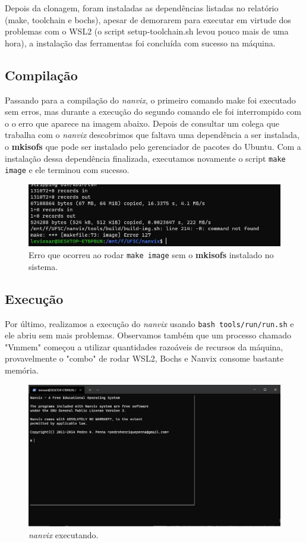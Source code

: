 \documentclass[12pt]{article}
\begin{document}
Depois da clonagem, foram instaladas as dependências listadas no relatório (make, toolchain e bochs), apesar de demorarem para executar em virtude dos problemas com o WSL2 (o script setup-toolchain.sh levou pouco mais de uma hora), a instalação das ferramentas foi concluída com sucesso na máquina. 

\subsection{Compilação}

Passando para a compilação do \emph{nanvix}, o primeiro comando make foi executado sem erros, mas durante a execução do segundo comando ele foi interrompido com o o erro que aparece na imagem abaixo. Depois de consultar um colega que trabalha com o \emph{nanvix} descobrimos que faltava uma dependência a ser instalada, o \textbf{mkisofs} que pode ser instalado pelo gerenciador de pacotes do Ubuntu. Com a instalação dessa dependência finalizada, executamos novamente o script \texttt{make image} e ele terminou com sucesso.

\begin{figure}[H]
    \includegraphics[width=\linewidth]{error.jpg}
    \caption{Erro que ocorreu ao rodar \texttt{make image} sem o \textbf{mkisofs} instalado no sistema.}
\end{figure}

\subsection{Execução}

Por último, realizamos a execução do \emph{nanvix} usando \texttt{bash tools/run/run.sh} e ele abriu sem mais problemas. Observamos também que um processo chamado "Vmmem" começou a utilizar quantidades razoáveis de recursos da máquina, provavelmente o "combo" de rodar WSL2, Bochs e Nanvix consome bastante memória. 

\begin{figure}[H]
    \includegraphics[width=\linewidth]{runnign.jpg}
    \caption{\emph{nanvix} executando.}
\end{figure}
\end{document}
